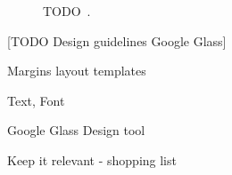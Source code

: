 	\begin{figure}[ht!]
		\centering
  	 \qquad
	\qquad
   	\qquad
   	\qquad
		\caption{TODO~\cite{cardLayout}.}
		\label{cardLayouts}
	\end{figure}


[TODO Design guidelines Google Glass]

Margins layout templates

Text, Font

Google Glass Design tool

Keep it relevant  - shopping list

